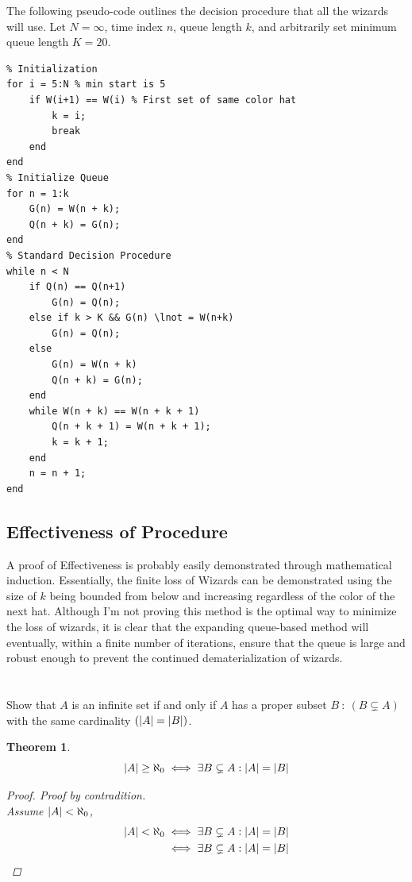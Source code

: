 \documentclass[]{article}
\newtheorem{theorem}{Theorem}
\begin{document}
\newpage
The following pseudo-code outlines the decision procedure that all the wizards will use. 
Let $N=\infty$, time index $n$, queue length $k$, and arbitrarily set minimum queue length $K = 20$.
\begin{lstlisting}
% Initialization
for i = 5:N % min start is 5
    if W(i+1) == W(i) % First set of same color hat
        k = i;
        break
    end
end
% Initialize Queue
for n = 1:k
    G(n) = W(n + k);
    Q(n + k) = G(n);
end
% Standard Decision Procedure
while n < N
    if Q(n) == Q(n+1)
        G(n) = Q(n);
    else if k > K && G(n) \lnot = W(n+k)
        G(n) = Q(n);
    else
        G(n) = W(n + k)
        Q(n + k) = G(n);
    end
    while W(n + k) == W(n + k + 1)
        Q(n + k + 1) = W(n + k + 1);
        k = k + 1;
    end
    n = n + 1;
end
\end{lstlisting}


\subsection*{Effectiveness of Procedure}
A proof of Effectiveness is probably easily demonstrated through mathematical induction. 
Essentially, the finite loss of Wizards can be demonstrated using the size of $k$ 
being bounded from below and increasing regardless of the color of the next hat. 
Although I'm not proving this method is the optimal way to minimize the loss of wizards, 
it is clear that the expanding queue-based method will eventually, within a finite number of 
iterations, ensure that the queue is large and robust enough to prevent the continued 
dematerialization of wizards.

\newpage
\section{}
Show that $A$ is an infinite set if and only if $A$ has a proper subset 
$B \ : \ (B \subsetneq A)$ with the same cardinality $(\abs{A} = \abs{B})$.\\

\begin{theorem}
    $$\abs{A} \geq \aleph_0 \iff \exists {B\subsetneq A} : \abs{A} = \abs{B}$$
    \begin{proof}
        Proof by contradition.\\
        Assume $\abs{A} < \aleph_0$,
        \begin{align*}
            \abs{A} < \aleph_0 &\iff \exists {B\subsetneq A} : \abs{A} = \abs{B}\\
            &\iff \exists {B\subsetneq A} : \abs{A} = \abs{B}\\
        \end{align*}
    \end{proof}
\end{theorem}
\end{document}
